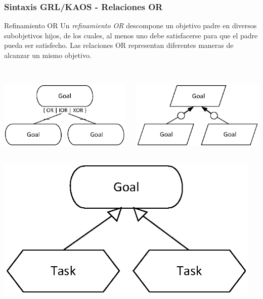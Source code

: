 \documentclass[handout,slidestop,xcolor=pst,dvips,blue]{beamer}
\begin{document}
\begin{frame}[c]
    \frametitle{Sintaxis GRL/KAOS - Relaciones OR}
    \begin{block}{Refinamiento OR}
        Un \alert{\emph{refinamiento OR}} descompone un objetivo padre en diversos subobjetivos hijos, de los cuales, al menos uno debe satisfacerse para que el padre pueda ser satisfecho. Las relaciones OR representan diferentes maneras de alcanzar un mismo objetivo.
        \ \\
        \ \\
        \begin{columns}[c]
            \begin{column}{0.50\linewidth}
                \centering \includegraphics[width=0.65\columnwidth,keepaspectratio=true]{images/objetivos/orRef(GRL).eps}
            \end{column}
            \begin{column}{0.50\linewidth}
                \centering \includegraphics[width=0.65\columnwidth,keepaspectratio=true]{images/objetivos/orRef(KAOS).eps}
            \end{column}
        \end{columns}
        \begin{columns}[c]
            \begin{column}{0.50\linewidth}
                \centering \includegraphics[width=0.65\columnwidth,keepaspectratio=true]{images/objetivos/meansEnd(GRL).eps}
            \end{column}
            \begin{column}{0.50\linewidth}
            \end{column}
        \end{columns}
     \end{block}
\end{frame}
\end{document}
